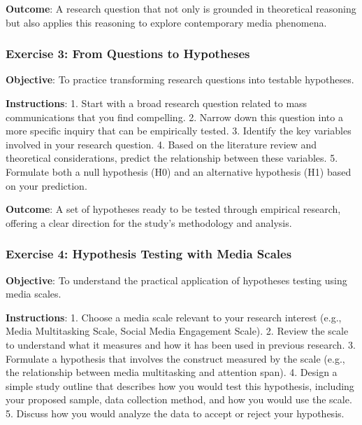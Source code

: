 \documentclass[
]{book}
\begin{document}
\textbf{Outcome}: A research question that not only is grounded in theoretical reasoning but also applies this reasoning to explore contemporary media phenomena.

\hypertarget{exercise-3-from-questions-to-hypotheses}{%
\subsubsection*{Exercise 3: From Questions to Hypotheses}\label{exercise-3-from-questions-to-hypotheses}}

\textbf{Objective}: To practice transforming research questions into testable hypotheses.

\textbf{Instructions}:
1. Start with a broad research question related to mass communications that you find compelling.
2. Narrow down this question into a more specific inquiry that can be empirically tested.
3. Identify the key variables involved in your research question.
4. Based on the literature review and theoretical considerations, predict the relationship between these variables.
5. Formulate both a null hypothesis (H0) and an alternative hypothesis (H1) based on your prediction.

\textbf{Outcome}: A set of hypotheses ready to be tested through empirical research, offering a clear direction for the study's methodology and analysis.

\hypertarget{exercise-4-hypothesis-testing-with-media-scales}{%
\subsubsection*{Exercise 4: Hypothesis Testing with Media Scales}\label{exercise-4-hypothesis-testing-with-media-scales}}

\textbf{Objective}: To understand the practical application of hypotheses testing using media scales.

\textbf{Instructions}:
1. Choose a media scale relevant to your research interest (e.g., Media Multitasking Scale, Social Media Engagement Scale).
2. Review the scale to understand what it measures and how it has been used in previous research.
3. Formulate a hypothesis that involves the construct measured by the scale (e.g., the relationship between media multitasking and attention span).
4. Design a simple study outline that describes how you would test this hypothesis, including your proposed sample, data collection method, and how you would use the scale.
5. Discuss how you would analyze the data to accept or reject your hypothesis.
\end{document}
